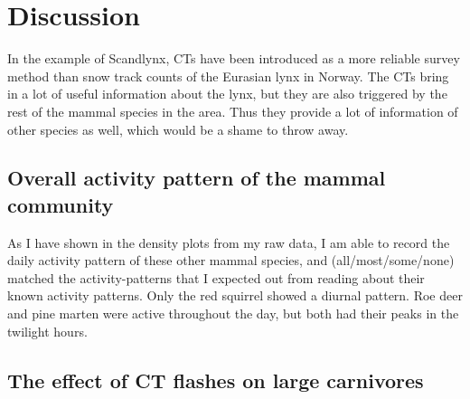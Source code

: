 \chapter{Discussion}



In the example of Scandlynx, CTs have been introduced as a more reliable survey method than snow track counts of the Eurasian lynx in Norway. The CTs bring in a lot of useful information about the lynx, but they are also triggered by the rest of the mammal species in the area. Thus they provide a lot of information of other species as well, which would be a shame to throw away.





\section{Overall activity pattern of the mammal community}

As I have shown %
in the density plots from my raw data, I am able to record the daily activity pattern of these other mammal species, and (all/most/some/none) matched the activity-patterns that I expected out from reading about their known activity patterns. %
Only the red squirrel showed a diurnal pattern. Roe deer and pine marten were active throughout the day, but both had their peaks in the twilight hours.


\section{The effect of CT flashes on large carnivores}

